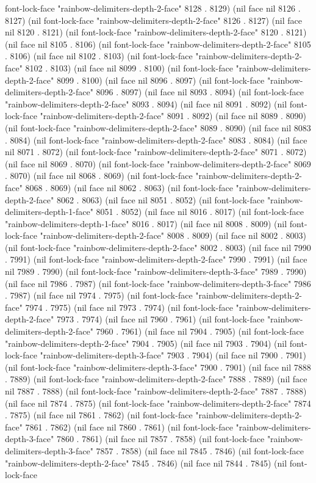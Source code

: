 font-lock-face "rainbow-delimiters-depth-2-face" 8128 . 8129) (nil face nil 8126 . 8127) (nil font-lock-face "rainbow-delimiters-depth-2-face" 8126 . 8127) (nil face nil 8120 . 8121) (nil font-lock-face "rainbow-delimiters-depth-2-face" 8120 . 8121) (nil face nil 8105 . 8106) (nil font-lock-face "rainbow-delimiters-depth-2-face" 8105 . 8106) (nil face nil 8102 . 8103) (nil font-lock-face "rainbow-delimiters-depth-2-face" 8102 . 8103) (nil face nil 8099 . 8100) (nil font-lock-face "rainbow-delimiters-depth-2-face" 8099 . 8100) (nil face nil 8096 . 8097) (nil font-lock-face "rainbow-delimiters-depth-2-face" 8096 . 8097) (nil face nil 8093 . 8094) (nil font-lock-face "rainbow-delimiters-depth-2-face" 8093 . 8094) (nil face nil 8091 . 8092) (nil font-lock-face "rainbow-delimiters-depth-2-face" 8091 . 8092) (nil face nil 8089 . 8090) (nil font-lock-face "rainbow-delimiters-depth-2-face" 8089 . 8090) (nil face nil 8083 . 8084) (nil font-lock-face "rainbow-delimiters-depth-2-face" 8083 . 8084) (nil face nil 8071 . 8072) (nil font-lock-face "rainbow-delimiters-depth-2-face" 8071 . 8072) (nil face nil 8069 . 8070) (nil font-lock-face "rainbow-delimiters-depth-2-face" 8069 . 8070) (nil face nil 8068 . 8069) (nil font-lock-face "rainbow-delimiters-depth-2-face" 8068 . 8069) (nil face nil 8062 . 8063) (nil font-lock-face "rainbow-delimiters-depth-2-face" 8062 . 8063) (nil face nil 8051 . 8052) (nil font-lock-face "rainbow-delimiters-depth-1-face" 8051 . 8052) (nil face nil 8016 . 8017) (nil font-lock-face "rainbow-delimiters-depth-1-face" 8016 . 8017) (nil face nil 8008 . 8009) (nil font-lock-face "rainbow-delimiters-depth-2-face" 8008 . 8009) (nil face nil 8002 . 8003) (nil font-lock-face "rainbow-delimiters-depth-2-face" 8002 . 8003) (nil face nil 7990 . 7991) (nil font-lock-face "rainbow-delimiters-depth-2-face" 7990 . 7991) (nil face nil 7989 . 7990) (nil font-lock-face "rainbow-delimiters-depth-3-face" 7989 . 7990) (nil face nil 7986 . 7987) (nil font-lock-face "rainbow-delimiters-depth-3-face" 7986 . 7987) (nil face nil 7974 . 7975) (nil font-lock-face "rainbow-delimiters-depth-2-face" 7974 . 7975) (nil face nil 7973 . 7974) (nil font-lock-face "rainbow-delimiters-depth-2-face" 7973 . 7974) (nil face nil 7960 . 7961) (nil font-lock-face "rainbow-delimiters-depth-2-face" 7960 . 7961) (nil face nil 7904 . 7905) (nil font-lock-face "rainbow-delimiters-depth-2-face" 7904 . 7905) (nil face nil 7903 . 7904) (nil font-lock-face "rainbow-delimiters-depth-3-face" 7903 . 7904) (nil face nil 7900 . 7901) (nil font-lock-face "rainbow-delimiters-depth-3-face" 7900 . 7901) (nil face nil 7888 . 7889) (nil font-lock-face "rainbow-delimiters-depth-2-face" 7888 . 7889) (nil face nil 7887 . 7888) (nil font-lock-face "rainbow-delimiters-depth-2-face" 7887 . 7888) (nil face nil 7874 . 7875) (nil font-lock-face "rainbow-delimiters-depth-2-face" 7874 . 7875) (nil face nil 7861 . 7862) (nil font-lock-face "rainbow-delimiters-depth-2-face" 7861 . 7862) (nil face nil 7860 . 7861) (nil font-lock-face "rainbow-delimiters-depth-3-face" 7860 . 7861) (nil face nil 7857 . 7858) (nil font-lock-face "rainbow-delimiters-depth-3-face" 7857 . 7858) (nil face nil 7845 . 7846) (nil font-lock-face "rainbow-delimiters-depth-2-face" 7845 . 7846) (nil face nil 7844 . 7845) (nil font-lock-face 